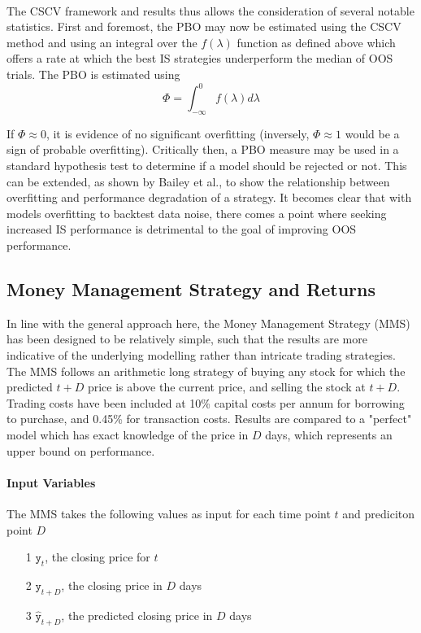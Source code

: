 \documentclass[a4paper,latin]{paper}
\begin{document}
\texttt{\\}
\newline The CSCV framework and results thus allows the consideration of several notable statistics. First and foremost, 
the PBO may now be estimated using the CSCV method and using an integral over the $f(\lambda)$ function 
as defined above which offers a rate at which the best IS strategies underperform the median of OOS trials. The PBO is estimated using
\begin{equation}
\Phi = \int_{-\infty}^{0} f (\lambda) d \lambda
\end{equation}


If $\Phi \approx 0$,
it is evidence of no significant overfitting (inversely, $\Phi \approx 1$ would be a sign of probable overfitting). Critically then, a PBO measure may be used in a standard hypothesis test to determine if a model should be rejected or not. This 
can be extended, as shown by Bailey et al., to show the relationship between overfitting and performance 
degradation of a strategy. It becomes clear that with models overfitting to backtest data noise, there comes a point 
where seeking increased IS performance is detrimental to the goal of improving OOS performance.  
\hfill \break 


\subsection{Money Management Strategy and Returns}\label{imp_mms}

In line with the general approach here, the Money Management Strategy (MMS) has been designed to be relatively simple, such that the results are more indicative of the underlying modelling rather than intricate trading strategies. The MMS follows an arithmetic long strategy of buying any stock for which the predicted ${t+D}$ price is above the current price, and selling the stock at ${t+D}$. Trading costs have been included at 10\% capital costs per annum for borrowing to purchase, and 0.45\% for transaction costs. Results are compared to a "perfect" model which has exact knowledge of the price in $D$ days, which represents an upper bound on performance.
\hfill\break

\paragraph{Input Variables}

The MMS takes the following values as input for each time point $t$  and prediciton point $D$
\begin{itemize}
	\item [1] {$\texttt{y}_t$}, the closing price for $t$
	\item [2] $\texttt{y}_{t+D}$, the closing price in $D$ days
	\item [3] $\hat{\texttt{y}}_{t+D}$, the predicted closing price in $D$ days
\end{itemize}
\end{document}
